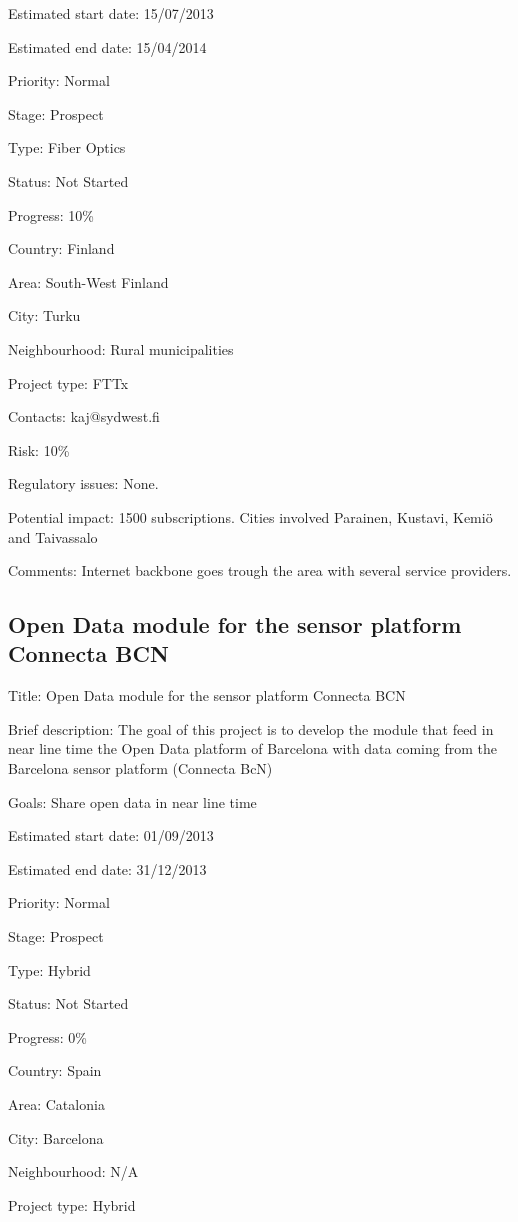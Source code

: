 \documentclass[draftclsnofoot,12pt,journal,onecolumn]{IEEEtran}
\begin{document}
Estimated start date: 15/07/2013 

Estimated end date: 15/04/2014 

Priority: Normal 

Stage: Prospect 

Type: Fiber Optics 

Status: Not Started 

Progress: 10\% 

Country: Finland 

Area: South-West Finland 

City: Turku 

Neighbourhood: Rural municipalities 

Project type: FTTx 

Contacts: kaj@sydwest.fi

Risk: 10\% 

Regulatory issues: None. 

Potential impact: 1500 subscriptions. Cities involved Parainen, Kustavi, 
Kemiö and Taivassalo 

Comments: Internet backbone goes trough the area with several service 
providers. 

\subsection{Open Data module for the sensor platform Connecta BCN} 

Title: Open Data module for the sensor platform Connecta BCN 

Brief description: The goal of this project is to develop the module that 
feed in near line time the Open Data platform of Barcelona with data coming 
from the Barcelona sensor platform (Connecta BcN) 

Goals: Share open data in near line time 

Estimated start date: 01/09/2013 

Estimated end date: 31/12/2013 

Priority: Normal 

Stage: Prospect 

Type: Hybrid 

Status: Not Started 

Progress: 0\% 

Country: Spain 

Area: Catalonia 

City: Barcelona 

Neighbourhood: N/A 

Project type: Hybrid 
\end{document}
